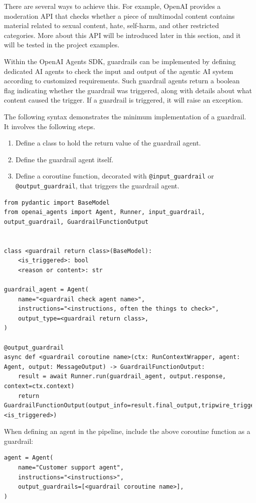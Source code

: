There are several ways to achieve this. For example, OpenAI provides a moderation API that checks whether a piece of multimodal content contains material related to sexual content, hate, self-harm, and other restricted categories. More about this API will be introduced later in this section, and it will be tested in the project examples.

Within the OpenAI Agents SDK, guardrails can be implemented by defining dedicated AI agents to check the input and output of the agentic AI system according to customized requirements. Such guardrail agents return a boolean flag indicating whether the guardrail was triggered, along with details about what content caused the trigger. If a guardrail is triggered, it will raise an exception.

The following syntax demonstrates the minimum implementation of a guardrail. It involves the following steps.
\begin{enumerate}
	\item Define a class to hold the return value of the guardrail agent. 
	\item Define the guardrail agent itself.  
	\item Define a coroutine function, decorated with \verb|@input_guardrail| or \verb|@output_guardrail|, that triggers the guardrail agent.
\end{enumerate}

\begin{lstlisting}
from pydantic import BaseModel
from openai_agents import Agent, Runner, input_guardrail, output_guardrail, GuardrailFunctionOutput


class <guardrail return class>(BaseModel):
	<is_triggered>: bool
	<reason or content>: str

guardrail_agent = Agent(
	name="<guardrail check agent name>",
	instructions="<instructions, often the things to check>",
	output_type=<guardrail return class>,
)

@output_guardrail
async def <guardrail coroutine name>(ctx: RunContextWrapper, agent: Agent, output: MessageOutput) -> GuardrailFunctionOutput:
	result = await Runner.run(guardrail_agent, output.response, context=ctx.context)
	return GuardrailFunctionOutput(output_info=result.final_output,tripwire_triggered=result.final_output.<is_triggered>)
\end{lstlisting}

When defining an agent in the pipeline, include the above coroutine function as a guardrail:

\begin{lstlisting}
agent = Agent( 
	name="Customer support agent",
	instructions="<instructions>",
	output_guardrails=[<guardrail coroutine name>],
)
\end{lstlisting}

